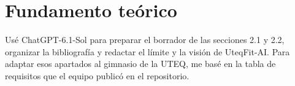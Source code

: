 \documentclass[11pt,a4paper]{article}
\begin{document}


\tableofcontents
\clearpage

\setcounter{section}{-1}


\setcounter{section}{1}
\section{Fundamento teórico}

















Usé ChatGPT-6.1-Sol para preparar el borrador de las secciones 2.1 y 2.2, organizar la bibliografía y redactar el límite y la visión de UteqFit-AI. Para adaptar esos apartados al gimnasio de la UTEQ, me basé en la tabla de requisitos que el equipo publicó en el repositorio.
\end{document}
